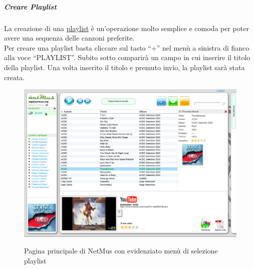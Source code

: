 \subparagraph{Creare Playlist}

La creazione di una \underline{playlist} \`e un'operazione molto semplice e
comoda per poter avere una sequenza delle canzoni preferite.\\
Per creare una playlist basta cliccare sul tasto ``+'' nel men\`u a sinistra di
fianco alla voce ``PLAYLIST''. Subito sotto comparir\`a un campo in cui
inserire il titolo della playlist. Una volta inserito il titolo e premuto invio,
la playlist sar\`a stata creata.\\
\begin{figure}[htbp]
  \centering
  \includegraphics[width=15cm]{img/MU/new_playlist.png}\\
\caption{Pagina principale di NetMus con evidenziato men\`u di selezione
playlist}
\end{figure}
 
